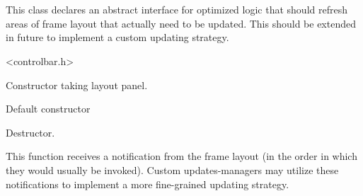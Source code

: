 %
%


\section{}\label{cbupdatesmanagerbase}


This class declares an abstract interface for optimized logic that should refresh
areas of frame layout that actually need to be updated. This should be extended in future
to implement a custom updating strategy.




<controlbar.h>




\label{cbupdatesmanagerbasecbupdatesmanagerbase}


Constructor taking layout panel.



Default constructor


\label{cbupdatesmanagerbasedtor}


Destructor.


\label{cbupdatesmanagerbaseonbarwillchange}


This function receives a notification from the frame layout (in the order in which
they would usually be invoked). Custom updates-managers may utilize
these notifications to implement a more fine-grained updating strategy.


\label{cbupdatesmanagerbaseonfinishchanges}


